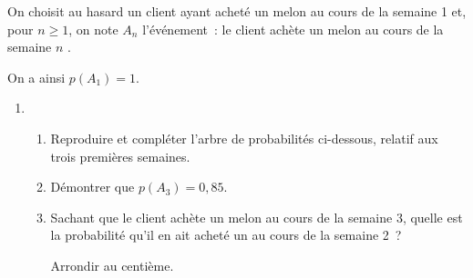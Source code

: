 \smallskip
On choisit au hasard un client ayant acheté un melon au cours de la semaine 1 et, pour $n \geqslant 1$, on
note $A_n$ l'événement~: \og le client achète un melon au cours de la semaine $n$ \fg.
\par
On a ainsi $p\left(A_1\right) = 1$.
\medskip
\begin{enumerate}
          \item
          \begin{enumerate}[label=\alph*.]
               \item Reproduire et compléter l'arbre de probabilités
               ci-dessous, relatif aux trois premières semaines.
\begin{center}
\begin{extern}%
{
      {
      }

     {
     }
}
\end{extern}
\end{center}
               \item Démontrer que $p\left(A_3\right) = 0,85$.
               \item Sachant que le client achète un melon au cours
               de la semaine 3, quelle est la probabilité qu'il en ait acheté un au cours de la semaine 2~?
               \par
               Arrondir au centième.
          \end{enumerate}


\end{enumerate}
